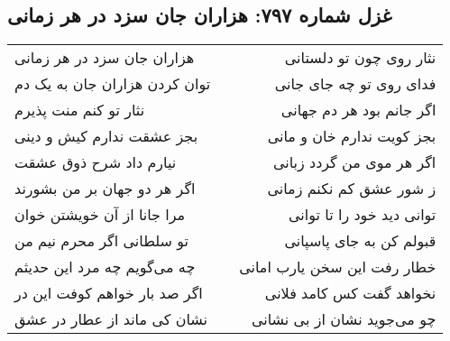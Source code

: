 \begin{center}
\section*{غزل شماره ۷۹۷: هزاران جان سزد در هر زمانی}
\label{sec:797}
\begin{longtable}{l p{0.5cm} r}
هزاران جان سزد در هر زمانی
&&
نثار روی چون تو دلستانی
\\
توان کردن هزاران جان به یک دم
&&
فدای روی تو چه جای جانی
\\
نثار تو کنم منت پذیرم
&&
اگر جانم بود هر دم جهانی
\\
بجز عشقت ندارم کیش و دینی
&&
بجز کویت ندارم خان و مانی
\\
نیارم داد شرح ذوق عشقت
&&
اگر هر موی من گردد زبانی
\\
اگر هر دو جهان بر من بشورند
&&
ز شور عشق کم نکنم زمانی
\\
مرا جانا از آن خویشتن خوان
&&
توانی دید خود را تا توانی
\\
تو سلطانی اگر محرم نیم من
&&
قبولم کن به جای پاسپانی
\\
چه می‌گویم چه مرد این حدیثم
&&
خطار رفت این سخن یارب امانی
\\
اگر صد بار خواهم کوفت این در
&&
نخواهد گفت کس کامد فلانی
\\
نشان کی ماند از عطار در عشق
&&
چو می‌جوید نشان از بی نشانی
\\
\end{longtable}
\end{center}
